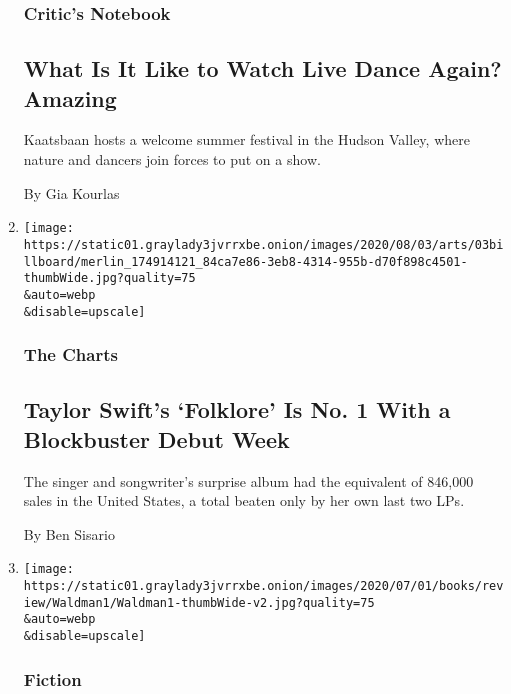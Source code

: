 \begin{enumerate}
  \hypertarget{critics-notebook-2}{%
  \subsubsection{Critic's Notebook}\label{critics-notebook-2}}

  \hypertarget{what-is-it-like-to-watch-live-dance-again-amazing}{%
  \subsection{What Is It Like to Watch Live Dance Again?
  Amazing}\label{what-is-it-like-to-watch-live-dance-again-amazing}}

  Kaatsbaan hosts a welcome summer festival in the Hudson Valley, where
  nature and dancers join forces to put on a show.

  By Gia Kourlas
\item
  \href{/2020/08/03/arts/music/taylor-swift-folklore-billboard-chart.html}{}

  \texttt{[image: https://static01.graylady3jvrrxbe.onion/images/2020/08/03/arts/03billboard/merlin\_174914121\_84ca7e86-3eb8-4314-955b-d70f898c4501-thumbWide.jpg?quality=75\\\&auto=webp\\\&disable=upscale]}

  \hypertarget{the-charts}{%
  \subsubsection{The Charts}\label{the-charts}}

  \hypertarget{taylor-swifts-folklore-is-no-1-with-a-blockbuster-debut-week}{%
  \subsection{Taylor Swift's `Folklore' Is No. 1 With a Blockbuster
  Debut
  Week}\label{taylor-swifts-folklore-is-no-1-with-a-blockbuster-debut-week}}

  The singer and songwriter's surprise album had the equivalent of
  846,000 sales in the United States, a total beaten only by her own
  last two LPs.

  By Ben Sisario
\item
  \href{/2020/08/03/books/review/kings-county-david-goodwillie.html}{}

  \texttt{[image: https://static01.graylady3jvrrxbe.onion/images/2020/07/01/books/review/Waldman1/Waldman1-thumbWide-v2.jpg?quality=75\\\&auto=webp\\\&disable=upscale]}

  \hypertarget{fiction}{%
  \subsubsection{Fiction}\label{fiction}}


\end{enumerate}
